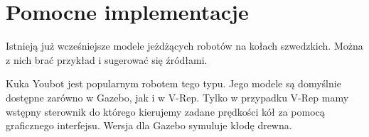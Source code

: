 \section{Pomocne implementacje}
Istnieją już wcześniejsze modele jeżdżących robotów na kołach szwedzkich.
Można z nich brać przykład i sugerować się źródłami.

Kuka Youbot jest popularnym robotem tego typu. Jego modele są domyślnie dostępne zarówno w Gazebo, jak i w V-Rep.
Tylko w przypadku V-Rep mamy wstępny sterownik do którego kierujemy zadane prędkości kół za pomocą graficznego interfejsu.
Wersja dla Gazebo symuluje kłodę drewna.
